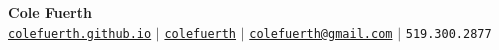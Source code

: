 \begin{center}
    \textbf{\Huge Cole Fuerth} \\ \vspace{5pt}
    \hspace{1pt} \faGlobe \hspace{2pt} \href{https://colefuerth.github.io/}{\texttt{colefuerth.github.io}} \hspace{1pt} $|$
    \hspace{1pt} \faGithub \hspace{2pt} \href{https://github.com/colefuerth}{\texttt{colefuerth}} \hspace{1pt} $|$
    \hspace{1pt} \faEnvelope \hspace{2pt} \href{mailto::colefuerth@gmail.com}{\texttt{colefuerth@gmail.com}} \hspace{1pt} $|$
    \small \faPhone* \texttt{519.300.2877}
    \\ \vspace{-3pt}
  \end{center}